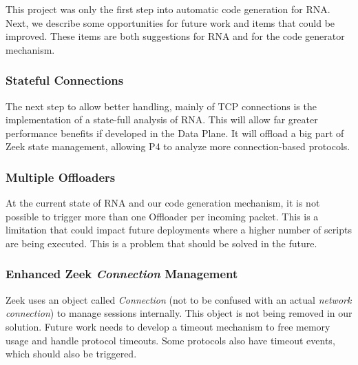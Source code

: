 This project was only the first step into automatic code generation for RNA. Next, we describe some opportunities for future work and items that could be improved. These items are both suggestions for RNA and for the code generator mechanism.

\subsubsection*{Stateful Connections}

The next step to allow better handling, mainly of TCP connections is the implementation of a state-full analysis of RNA. This will allow far greater performance benefits if developed in the Data Plane. It will offload a big part of Zeek state management, allowing P4 to analyze more connection-based protocols.


\subsubsection*{Multiple Offloaders}

At the current state of RNA and our code generation mechanism, it is not possible to trigger more than one Offloader per incoming packet. This is a limitation that could impact future deployments where a higher number of scripts are being executed. This is a problem that should be solved in the future.


\subsubsection*{Enhanced Zeek \textit{Connection} Management}

Zeek uses an object called \textit{Connection} (not to be confused with an actual \textit{network connection}) to manage sessions internally. This object is not being removed in our solution. Future work needs to develop a timeout mechanism to free memory usage and handle protocol timeouts. Some protocols also have timeout events, which should also be triggered.


% 
